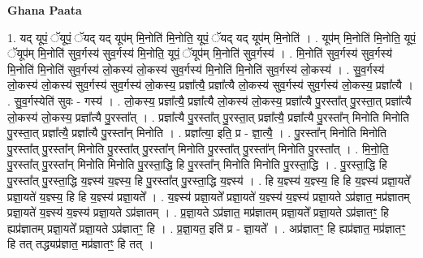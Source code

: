 \documentclass[17pt]{extarticle}
\begin{document}
\textbf{Ghana Paata } \newline

1. यद् यूपं॒ ॅयूपं॒ ॅयद् यद् यूप॑म् मि॒नोति॑ मि॒नोति॒ यूपं॒ ॅयद् यद् यूप॑म् मि॒नोति॑ । . यूप॑म् मि॒नोति॑ मि॒नोति॒ यूपं॒ ॅयूप॑म् मि॒नोति॑ सुव॒र्गस्य॑ सुव॒र्गस्य॑ मि॒नोति॒ यूपं॒ ॅयूप॑म् मि॒नोति॑ सुव॒र्गस्य॑ । . मि॒नोति॑ सुव॒र्गस्य॑ सुव॒र्गस्य॑ मि॒नोति॑ मि॒नोति॑ सुव॒र्गस्य॑ लो॒कस्य॑ लो॒कस्य॑ सुव॒र्गस्य॑ मि॒नोति॑ मि॒नोति॑ सुव॒र्गस्य॑ लो॒कस्य॑ । . सु॒व॒र्गस्य॑ लो॒कस्य॑ लो॒कस्य॑ सुव॒र्गस्य॑ सुव॒र्गस्य॑ लो॒कस्य॒ प्रज्ञा᳚त्यै॒ प्रज्ञा᳚त्यै लो॒कस्य॑ सुव॒र्गस्य॑ सुव॒र्गस्य॑ लो॒कस्य॒ प्रज्ञा᳚त्यै । . सु॒व॒र्गस्येति॑ सुवः - गस्य॑ । . लो॒कस्य॒ प्रज्ञा᳚त्यै॒ प्रज्ञा᳚त्यै लो॒कस्य॑ लो॒कस्य॒ प्रज्ञा᳚त्यै पु॒रस्ता᳚त् पु॒रस्ता॒त् प्रज्ञा᳚त्यै लो॒कस्य॑ लो॒कस्य॒ प्रज्ञा᳚त्यै पु॒रस्ता᳚त् । . प्रज्ञा᳚त्यै पु॒रस्ता᳚त् पु॒रस्ता॒त् प्रज्ञा᳚त्यै॒ प्रज्ञा᳚त्यै पु॒रस्ता᳚न् मिनोति मिनोति पु॒रस्ता॒त् प्रज्ञा᳚त्यै॒ प्रज्ञा᳚त्यै पु॒रस्ता᳚न् मिनोति । . प्रज्ञा᳚त्या॒ इति॒ प्र - ज्ञा॒त्यै॒ । . पु॒रस्ता᳚न् मिनोति मिनोति पु॒रस्ता᳚त् पु॒रस्ता᳚न् मिनोति पु॒रस्ता᳚त् पु॒रस्ता᳚न् मिनोति पु॒रस्ता᳚त् पु॒रस्ता᳚न् मिनोति पु॒रस्ता᳚त् । . मि॒नो॒ति॒ पु॒रस्ता᳚त् पु॒रस्ता᳚न् मिनोति मिनोति पु॒रस्ता॒द्धि हि पु॒रस्ता᳚न् मिनोति मिनोति पु॒रस्ता॒द्धि । . पु॒रस्ता॒द्धि हि पु॒रस्ता᳚त् पु॒रस्ता॒द्धि य॒ज्ञ्स्य॑ य॒ज्ञ्स्य॒ हि पु॒रस्ता᳚त् पु॒रस्ता॒द्धि य॒ज्ञ्स्य॑ । . हि य॒ज्ञ्स्य॑ य॒ज्ञ्स्य॒ हि हि य॒ज्ञ्स्य॑ प्रज्ञा॒यते᳚ प्रज्ञा॒यते॑ य॒ज्ञ्स्य॒ हि हि य॒ज्ञ्स्य॑ प्रज्ञा॒यते᳚ । . य॒ज्ञ्स्य॑ प्रज्ञा॒यते᳚ प्रज्ञा॒यते॑ य॒ज्ञ्स्य॑ य॒ज्ञ्स्य॑ प्रज्ञा॒यते ऽप्र॑ज्ञात॒ मप्र॑ज्ञातम् प्रज्ञा॒यते॑ य॒ज्ञ्स्य॑ य॒ज्ञ्स्य॑ प्रज्ञा॒यते ऽप्र॑ज्ञातम् । . प्र॒ज्ञा॒यते ऽप्र॑ज्ञात॒ मप्र॑ज्ञातम् प्रज्ञा॒यते᳚ प्रज्ञा॒यते ऽप्र॑ज्ञातꣳ॒॒ हि ह्यप्र॑ज्ञातम् प्रज्ञा॒यते᳚ प्रज्ञा॒यते ऽप्र॑ज्ञातꣳ॒॒ हि । . प्र॒ज्ञा॒यत॒ इति॑ प्र - ज्ञा॒यते᳚ । . अप्र॑ज्ञातꣳ॒॒ हि ह्यप्र॑ज्ञात॒ मप्र॑ज्ञातꣳ॒॒ हि तत् तद्ध्यप्र॑ज्ञात॒ मप्र॑ज्ञातꣳ॒॒ हि तत् । \newline
\end{document}
